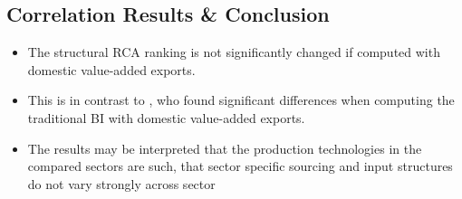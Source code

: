 \begin{comment}
  60-64 & 0.88 \sym{***}& 0.83 \sym{***}& 0.05  \\ 
  65-67 & 0.88 \sym{***}& 0.84 \sym{***}& 0.04  \\ 
  70-74 & 0.82 \sym{***}& 0.80 \sym{***}& 0.03  \\ 
  75-95 & 0.87 \sym{***}& 0.85 \sym{***}& 0.03 \\ 
  AVG & 0.90 & 0.88 &   \\ 
   \bottomrule
   \multicolumn{4}{l}{\footnotesize \sym{*} \(p<0.05\), \sym{**} \(p<0.01\), \sym{***} \(p<0.001\)}\\
   \multicolumn{4}{l}{ISIC Rev. 3.1 Code} \\
   \multicolumn{4}{l}{Structural RCA based on domestic valued added exports} \\
   \multicolumn{4}{l}{Benchmark Industry ISIC Rev. 3 01-05 Agriculture}\\
   \multicolumn{4}{l}{Benchmark Country Rest of the World}\\
\end{tabular}
\end{table}
\end{comment}
\subsection*{Correlation Results \& Conclusion}
\begin{itemize}
\item The structural RCA ranking is not significantly changed if computed with domestic value-added exports.
   \item This is in contrast to \textcite{Koopman}, who found significant differences when computing the traditional BI with domestic value-added exports. 
 \item  The results may be interpreted that the production technologies in the compared  sectors are such, that sector specific sourcing and input structures do not vary strongly across sector
 \end{itemize}
